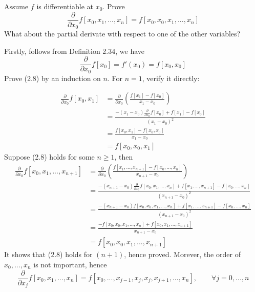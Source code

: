 \documentclass[11pt]{elegantbook}
\begin{document}
\vspace{1.5em}

\begin{problem}
  Assume $f$ is differentiable at $x_0$. Prove
  \begin{equation}
    \frac{\partial}{\partial x_0} f[x_0,x_1,...,x_n] = f[x_0,x_0,x_1,...,x_n]
  \end{equation}
  What about the partial derivate with respect to one of the other variables?
\end{problem}

\begin{solution}
  Firstly, follows from Definition 2.34, we have
  \begin{equation*}
    \frac{\partial}{\partial x_0}f[x_0]=f'(x_0)=f[x_0,x_0]
  \end{equation*}
  Prove (2.8) by an induction on $n$. For $n=1$, verify it directly:

  \begin{align*}
    \frac{\partial}{\partial x_0} f[x_0,x_1] &= \frac{\partial}{\partial x_0}\left(\frac{f[x_1]-f[x_0]}{x_1-x_0}\right)\\
    &= \frac{-(x_1-x_0)\frac{\partial}{\partial x_0}f[x_0]+f[x_1]-f[x_0]}{(x_1-x_0)^2}\\
    &= \frac{f[x_0,x_1]-f[x_0,x_0]}{x_1-x_0}\\
    & = f[x_0,x_0,x_1]
  \end{align*}
  Suppose (2.8) holds for some $n\geq 1$, then
  \begin{align*}
    \frac{\partial}{\partial x_0} f[x_0,x_1,...,x_{n+1}] &= \frac{\partial}{\partial x_0}\left(\frac{f[x_1,...,x_{n+1}]-f[x_0,...,x_{n}]}{x_{n+1}-x_0}\right)\\
    &= \frac{-(x_{n+1}-x_0)\frac{\partial}{\partial x_0}f[x_0,x_1,...,x_{n}]+f[x_1,...,x_{n+1}]-f[x_0,...,x_n]}{(x_{n+1}-x_0)^2}\\
    &= \frac{-(x_{n+1}-x_0)f[x_0,x_0,x_1,...,x_{n}]+f[x_1,...,x_{n+1}]-f[x_0,...,x_n]}{(x_{n+1}-x_0)^2}\\
    &= \frac{-f[x_0,x_0,x_1,...,x_{n}]+f[x_0,x_1,...,x_{n+1}]}{x_{n+1}-x_0}\\
    & = f[x_0,x_0,x_1,...,x_{n+1}]
  \end{align*}
  It shows that (2.8) holds for $(n+1)$, hence proved. Morever, the order of $x_0,...,x_n$ is not important, hence
  \begin{equation*}
    \frac{\partial}{\partial x_j} f[x_0,x_1,...,x_n] = f[x_0,...,x_{j-1},x_j,x_j,x_{j+1},...,x_n], \qquad \forall j=0,...,n
  \end{equation*}
\end{solution}
\end{document}
